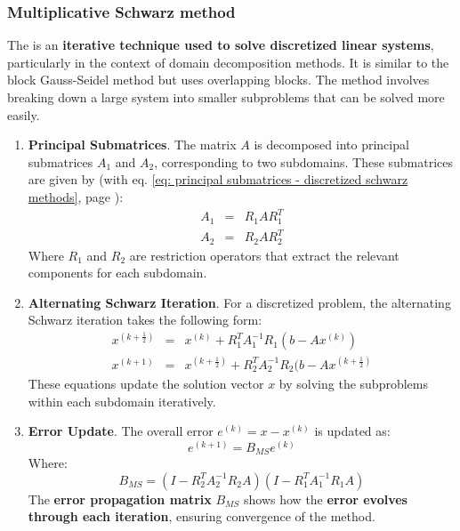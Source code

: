 \subsubsection{Multiplicative Schwarz method}

The  is an \textbf{iterative technique used to solve discretized linear systems}, particularly in the context of domain decomposition methods. It is similar to the block Gauss-Seidel method but uses overlapping blocks. The method involves breaking down a large system into smaller subproblems that can be solved more easily.

\begin{enumerate}
    \item \textbf{Principal Submatrices}. The matrix $A$ is decomposed into principal submatrices $A_{1}$ and $A_{2}$, corresponding to two subdomains. These submatrices are given by (with eq. \ref{eq: principal submatrices - discretized schwarz methods}, page \pageref{eq: principal submatrices - discretized schwarz methods}):
    \begin{equation*}
        \begin{array}{rcl}
            A_{1} &=& R_{1} A R_{1}^{T} \\ [.5em]
            A_{2} &=& R_{2} A R_{2}^{T}
        \end{array}
    \end{equation*}
    Where $R_{1}$ and $R_{2}$ are restriction operators that extract the relevant components for each subdomain.

    \item \textbf{Alternating Schwarz Iteration}. For a discretized problem, the alternating Schwarz iteration takes the following form:
    \begin{equation*}
        \begin{array}{rcl}
            x^{(k+\frac{1}{2})} &=& x^{(k)} + R_{1}^{T} A_{1}^{-1} R_{1} (b - A x^{(k)}) \\ [.5em]
            x^{(k+1)} &=& x^{(k+\frac{1}{2})} + R_{2}^{T} A_{2}^{-1} R_{2} (b - A x^{(k+\frac{1}{2})}
        \end{array}
    \end{equation*}
    These equations update the solution vector $x$ by solving the subproblems within each subdomain iteratively.

    \item \textbf{Error Update}. The overall error $e^{(k)} = x - x^{(k)}$ is updated as:
    \begin{equation*}
        e^{(k+1)} = B_{MS} e^{(k)}
    \end{equation*}
    Where:
    \begin{equation*}
        B_{MS} = \left(I - R_{2}^{T} A_{2}^{-1} R_{2} A\right)\left(I - R_{1}^{T} A_{1}^{-1} R_{1} A\right)
    \end{equation*}
    The \textbf{error propagation matrix} $B_{MS}$ shows how the \textbf{error evolves through each iteration}, ensuring convergence of the method.
\end{enumerate}

